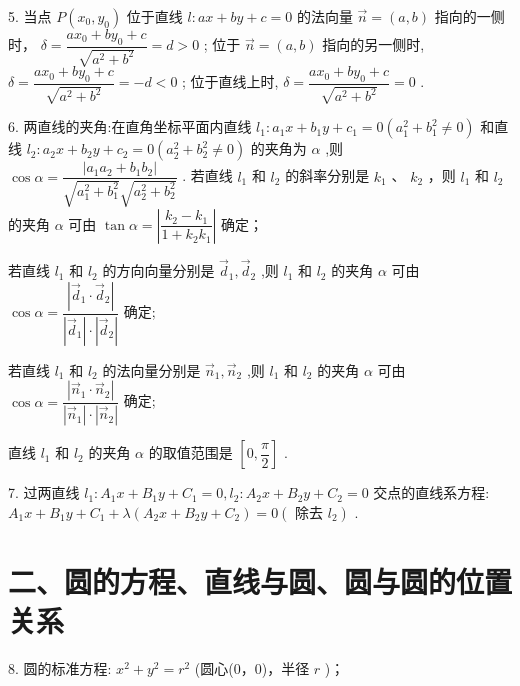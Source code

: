 5. 当点 $P\left( {{x}_{0},{y}_{0}}\right)$ 位于直线 $l : {ax} + {by} + c = 0$ 的法向量 $\overrightarrow{n} = \left( {a,b}\right)$ 指向的一侧时， $\delta  = \dfrac{a{x}_{0} + b{y}_{0} + c}{\sqrt{{a}^{2} + {b}^{2}}} =  d > 0$ ; 位于 $\overrightarrow{n} = \left( {a,b}\right)$ 指向的另一侧时, $\delta  = \dfrac{a{x}_{0} + b{y}_{0} + c}{\sqrt{{a}^{2} + {b}^{2}}} =  - d < 0$ ; 位于直线上时, $\delta  = \dfrac{a{x}_{0} + b{y}_{0} + c}{\sqrt{{a}^{2} + {b}^{2}}} = 0$ .

6. 两直线的夹角:在直角坐标平面内直线 ${l}_{1} : {a}_{1}x + {b}_{1}y + {c}_{1} = 0\left( {{a}_{1}^{2} + {b}_{1}^{2} \neq  0}\right)$ 和直线 ${l}_{2} : {a}_{2}x + {b}_{2}y + {c}_{2} =  0\left( {{a}_{2}^{2} + {b}_{2}^{2} \neq  0}\right)$ 的夹角为 $\alpha$ ,则 $\cos \alpha  = \dfrac{\left| {a}_{1}{a}_{2} + {b}_{1}{b}_{2}\right| }{\sqrt{{a}_{1}^{2} + {b}_{1}^{2}}\sqrt{{a}_{2}^{2} + {b}_{2}^{2}}}$ . 若直线 ${l}_{1}$ 和 ${l}_{2}$ 的斜率分别是 ${k}_{1}$ 、 ${k}_{2}$ ，则 ${l}_{1}$ 和 ${l}_{2}$ 的夹角 $\alpha$ 可由 $\tan \alpha  = \left| \dfrac{{k}_{2} - {k}_{1}}{1 + {k}_{2}{k}_{1}}\right|$ 确定；

若直线 ${l}_{1}$ 和 ${l}_{2}$ 的方向向量分别是 ${\overrightarrow{d}}_{1},{\overrightarrow{d}}_{2}$ ,则 ${l}_{1}$ 和 ${l}_{2}$ 的夹角 $\alpha$ 可由 $\cos \alpha  = \dfrac{\left| {\overrightarrow{d}}_{1} \cdot  {\overrightarrow{d}}_{2}\right| }{\left| {\overrightarrow{d}}_{1}\right|  \cdot  \left| {\overrightarrow{d}}_{2}\right| }$ 确定;

若直线 ${l}_{1}$ 和 ${l}_{2}$ 的法向量分别是 ${\overrightarrow{n}}_{1},{\overrightarrow{n}}_{2}$ ,则 ${l}_{1}$ 和 ${l}_{2}$ 的夹角 $\alpha$ 可由 $\cos \alpha  = \dfrac{\left| {\overrightarrow{n}}_{1} \cdot  {\overrightarrow{n}}_{2}\right| }{\left| {\overrightarrow{n}}_{1}\right|  \cdot  \left| {\overrightarrow{n}}_{2}\right| }$ 确定;

直线 ${l}_{1}$ 和 ${l}_{2}$ 的夹角 $\alpha$ 的取值范围是 $\left\lbrack  {0,\dfrac{\pi }{2}}\right\rbrack$ .

7. 过两直线 ${l}_{1} : {A}_{1}x + {B}_{1}y + {C}_{1} = 0,{l}_{2} : {A}_{2}x + {B}_{2}y + {C}_{2} = 0$ 交点的直线系方程: ${A}_{1}x + {B}_{1}y + {C}_{1} +  \lambda \left( {{A}_{2}x + {B}_{2}y + {C}_{2}}\right)  = 0\left( {\text{ 除去 }{l}_{2}}\right)$ .

\section*{二、圆的方程、直线与圆、圆与圆的位置关系}

8. 圆的标准方程: ${x}^{2} + {y}^{2} = {r}^{2}$ (圆心(0，0)，半径 $r$ )；

